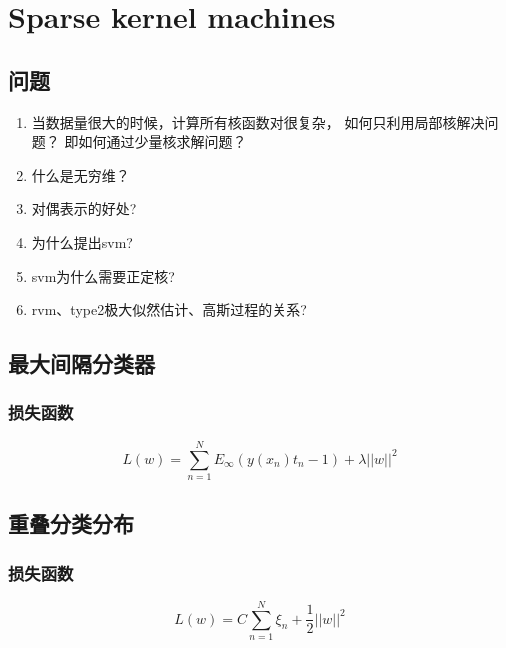 \chapter{Sparse kernel machines}
\section{问题}
\begin{enumerate}
\item 当数据量很大的时候，计算所有核函数对很复杂，
如何只利用局部核解决问题？ 即如何通过少量核求解问题？
\item 什么是无穷维？
\item 对偶表示的好处?
\item 为什么提出svm?
\item svm为什么需要正定核?
\item rvm、type2极大似然估计、高斯过程的关系?
\end{enumerate}

\section{最大间隔分类器}
\subsection{损失函数}
\begin{equation}
L(w) = \sum_{n=1}^N E_\infty(y(x_n)t_n - 1) + \lambda||w||^2
\end{equation}
\section{重叠分类分布}

\subsection{损失函数}
\begin{equation}
L(w) = C\sum_{n=1}^N\xi_n + \frac{1}{2}||w||^2
\end{equation}

